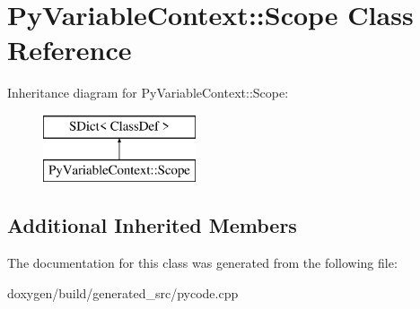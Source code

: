 \hypertarget{class_py_variable_context_1_1_scope}{}\section{Py\+Variable\+Context\+::Scope Class Reference}
\label{class_py_variable_context_1_1_scope}
Inheritance diagram for Py\+Variable\+Context\+::Scope\+:\begin{figure}[H]
\begin{center}
\leavevmode
\includegraphics[height=2.000000cm]{class_py_variable_context_1_1_scope}
\end{center}
\end{figure}
\subsection*{Additional Inherited Members}


The documentation for this class was generated from the following file\+:\begin{DoxyCompactItemize}
\item 
doxygen/build/generated\+\_\+src/pycode.\+cpp\end{DoxyCompactItemize}
